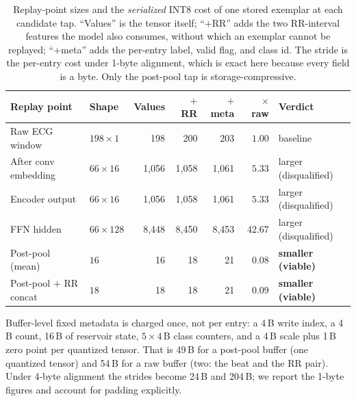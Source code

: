 \begin{table}[H]
\centering
\small
\caption{Replay-point sizes and the \emph{serialized} INT8 cost of one stored
exemplar at each candidate tap. ``Values'' is the tensor itself; ``$+$RR'' adds
the two RR-interval features the model also consumes, without which an exemplar
cannot be replayed; ``$+$meta'' adds the per-entry label, valid flag, and class
id. The stride is the per-entry cost under 1-byte alignment, which is exact here
because every field is a byte. Only the post-pool tap is storage-compressive.}
\label{tab:replay_bytes}
\setlength{\tabcolsep}{5pt}
\begin{tabular}{llrrrrl}
\toprule
Replay point & Shape & Values & $+$RR & $+$meta & $\times$ raw & Verdict \\
\midrule
Raw ECG window          & $198\times1$  & 198   & 200   & 203   & $1.00$  & baseline \\
After conv embedding    & $66\times16$  & 1{,}056 & 1{,}058 & 1{,}061 & $5.33$  & larger (disqualified) \\
Encoder output          & $66\times16$  & 1{,}056 & 1{,}058 & 1{,}061 & $5.33$  & larger (disqualified) \\
FFN hidden              & $66\times128$ & 8{,}448 & 8{,}450 & 8{,}453 & $42.67$ & larger (disqualified) \\
Post-pool (mean)        & $16$          & 16    & 18    & 21    & $0.08$  & \textbf{smaller (viable)} \\
Post-pool $+$ RR concat & $18$          & 18    & 18    & 21    & $0.09$  & \textbf{smaller (viable)} \\
\bottomrule
\end{tabular}

\vspace{0.4em}
{\small Buffer-level fixed metadata is charged once, not per entry: a 4\,B write
index, a 4\,B count, 16\,B of reservoir state, $5\times4$\,B class counters, and a
4\,B scale plus 1\,B zero point per quantized tensor. That is 49\,B for a
post-pool buffer (one quantized tensor) and 54\,B for a raw buffer (two: the beat
and the RR pair). Under 4-byte alignment the strides become 24\,B and 204\,B;
we report the 1-byte figures and account for padding explicitly.}
\end{table}

